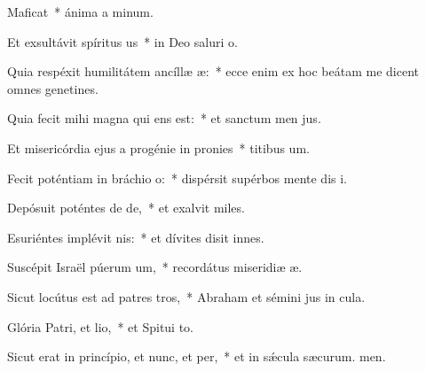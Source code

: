\item Maficat~* ánima a minum.
\item Et exsultávit spíritus us~* in Deo saluri o.
\item Quia respéxit humilitátem ancíllæ æ:~* ecce enim ex hoc beátam me dicent omnes genetines.
\item Quia fecit mihi magna qui ens est:~* et sanctum men jus.
\item Et misericórdia ejus a progénie in pronies~* titibus um.
\item Fecit poténtiam in bráchio o:~* dispérsit supérbos mente dis i.
\item Depósuit poténtes de de,~* et exalvit miles.
\item Esuriéntes implévit nis:~* et dívites disit innes.
\item Suscépit Israël púerum um,~* recordátus miseridiæ æ.
\item Sicut locútus est ad patres tros,~* Abraham et sémini jus in cula.
\item Glória Patri, et lio,~* et Spitui to.
\item Sicut erat in princípio, et nunc, et per,~* et in sǽcula sæcurum. men.
